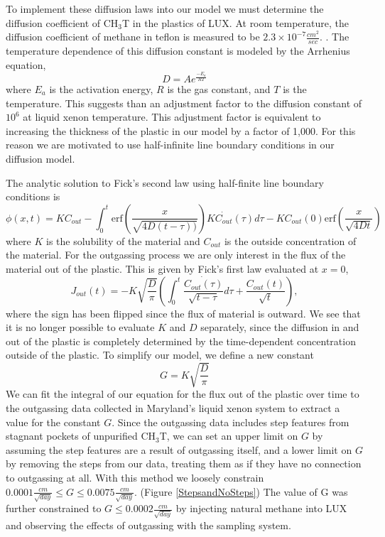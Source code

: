 \documentclass[a4paper,12pt]{article}
\begin{document}
{To implement these diffusion laws into our model we must determine the diffusion coefficient of CH$_3$T in the plastics of LUX. At room temperature, the diffusion coefficient of methane in teflon is measured to be $2.3 \times 10^{-7} \frac{cm^2}{sec}$. \cite{MethaneDiffusion}.  The temperature dependence of this diffusion constant is modeled by the Arrhenius equation,  
\begin{equation}
D=Ae^{\frac{-E_a}{RT}}
\end{equation}
where $E_a$ is the activation energy, $R$ is the gas constant, and $T$ is the temperature.  This suggests than an adjustment factor to the diffusion constant of $10^6$ at liquid xenon
temperature. This adjustment factor is equivalent to increasing the thickness of the plastic in our model by a factor of 1,000. For this reason we are motivated
to use half-infinite line boundary conditions in our diffusion model.

The analytic solution to Fick's second law using half-finite line boundary conditions is
\begin{equation}
\phi(x,t) = KC_{out} - \int_0^t \text{erf}\left(\frac{x}{\sqrt{4D(t-\tau))}}\right)K \dot{C_{out}}(\tau)d\tau - KC_{out}(0)\text{erf}\left(\frac{x}{\sqrt{4Dt}}\right)
\end{equation}
where $K$ is the solubility of the material and $C_{out}$ is the outside concentration of the material.  \cite{FicksAnalytic}  For the outgassing process we are only interest in the flux of the material out of the plastic.  This is given by Fick's first law evaluated at $x=0$,
\begin{equation}
J_{out}(t)=-K\sqrt{\frac{D}{\pi}} \left( \int_0^t \frac{\dot{C_{out}(\tau)}}{\sqrt{t-\tau}}d\tau + \frac{C_{out}(t)}{\sqrt{t}} \right),
\end{equation}
where the sign has been flipped since the flux of material is outward. We see that it is no longer possible to evaluate $K$ and $D$ separately, since the diffusion in and out of the plastic is completely determined by the time-dependent concentration outside of the plastic. To simplify our model, we define a new constant
\begin{equation}
G=K\sqrt{\frac{D}{\pi}}
\end{equation}
We can fit the integral of our equation for the flux out of the plastic over time to the outgassing data collected in Maryland's liquid xenon system to extract a value for the constant $G$. Since the outgassing data includes step features from stagnant pockets of unpurified CH$_3$T, we can set an upper limit on $G$ by assuming the step features are a result of outgassing itself, and a lower limit on $G$ by removing the steps from our data, treating them as if they have no connection to outgassing at all. With this method
we loosely constrain $0.0001 \frac{cm}{\sqrt{day}} \le G \le 0.0075  \frac{cm}{\sqrt{day}}$. (Figure \ref{StepsandNoSteps}) The value of G was further constrained to $G \le 0.0002 \frac{cm}{\sqrt{day}}$ by injecting natural methane into LUX and observing the effects of outgassing with the sampling system. 

}
\end{document}

